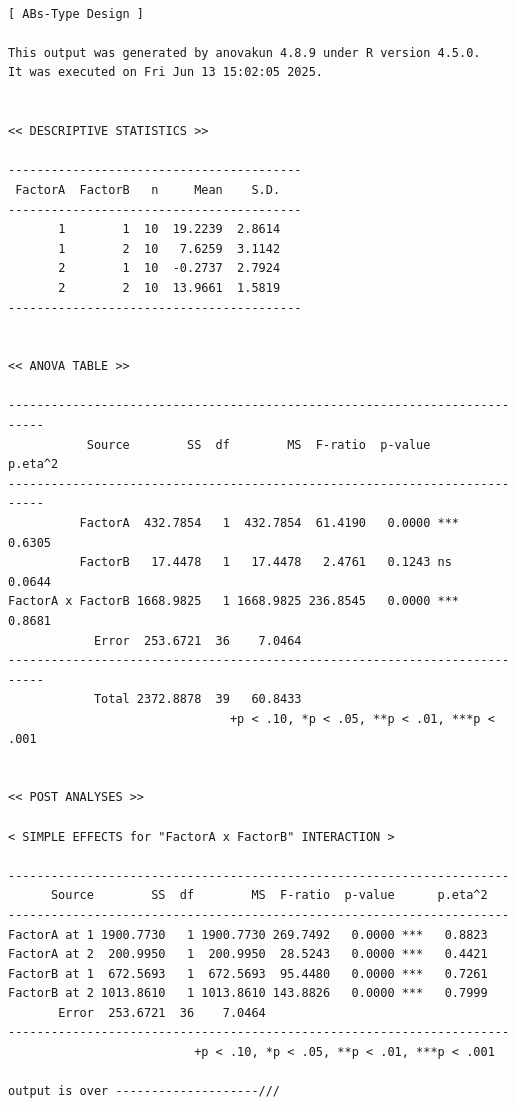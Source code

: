 \documentclass[
  a4paper,
]{ltjsbook}
\begin{document}
\begin{verbatim}

[ ABs-Type Design ]

This output was generated by anovakun 4.8.9 under R version 4.5.0.
It was executed on Fri Jun 13 15:02:05 2025.

 
<< DESCRIPTIVE STATISTICS >>

-----------------------------------------
 FactorA  FactorB   n     Mean    S.D. 
-----------------------------------------
       1        1  10  19.2239  2.8614 
       1        2  10   7.6259  3.1142 
       2        1  10  -0.2737  2.7924 
       2        2  10  13.9661  1.5819 
-----------------------------------------


<< ANOVA TABLE >>

---------------------------------------------------------------------------
           Source        SS  df        MS  F-ratio  p-value      p.eta^2 
---------------------------------------------------------------------------
          FactorA  432.7854   1  432.7854  61.4190   0.0000 ***   0.6305 
          FactorB   17.4478   1   17.4478   2.4761   0.1243 ns    0.0644 
FactorA x FactorB 1668.9825   1 1668.9825 236.8545   0.0000 ***   0.8681 
            Error  253.6721  36    7.0464                                
---------------------------------------------------------------------------
            Total 2372.8878  39   60.8433                                
                               +p < .10, *p < .05, **p < .01, ***p < .001


<< POST ANALYSES >>

< SIMPLE EFFECTS for "FactorA x FactorB" INTERACTION >

----------------------------------------------------------------------
      Source        SS  df        MS  F-ratio  p-value      p.eta^2 
----------------------------------------------------------------------
FactorA at 1 1900.7730   1 1900.7730 269.7492   0.0000 ***   0.8823 
FactorA at 2  200.9950   1  200.9950  28.5243   0.0000 ***   0.4421 
FactorB at 1  672.5693   1  672.5693  95.4480   0.0000 ***   0.7261 
FactorB at 2 1013.8610   1 1013.8610 143.8826   0.0000 ***   0.7999 
       Error  253.6721  36    7.0464                                
----------------------------------------------------------------------
                          +p < .10, *p < .05, **p < .01, ***p < .001

output is over --------------------///
\end{verbatim}
\end{document}
